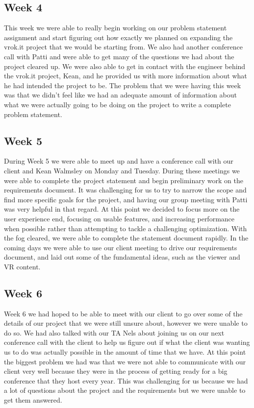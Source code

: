 \documentclass[10pt,draftclsnofoot,onecolumn]{IEEEtran}
\begin{document}
\subsection{Week 4}
This week we were able to really begin working on our problem statement assignment and start figuring out how exactly we planned on expanding the vrok.it project that we would be starting from. We also had another conference call with Patti and were able to get many of the questions we had about the project cleared up. We were also able to get in contact with the engineer behind the vrok.it project, Kean, and he provided us with more information about what he had intended the project to be. The problem that we were having this week was that we didn't feel like we had an adequate amount of information about what we were actually going to be doing on the project to write a complete problem statement. 

\subsection{Week 5}
During Week 5 we were able to meet up and have a conference call with our client and Kean Walmsley on Monday and Tuesday. During these meetings we were able to complete the project statement and begin preliminary work on the requirements document. It was challenging for us to try to narrow the scope and find more specific goals for the project, and having our group meeting with Patti was very helpful in that regard. At this point we decided to focus more on the user experience end, focusing on usable features, and increasing performance when possible rather than attempting to tackle a challenging optimization. With the fog cleared, we were able to complete the statement document rapidly. In the coming days we were able to use our client meeting to drive our requirements document, and laid out some of the fundamental ideas, such as the viewer and VR content.

\subsection{Week 6}
Week 6 we had hoped to be able to meet with our client to go over some of the details of our project that we were still unsure about, however we were unable to do so. We had also talked with our TA Nels about joining us on our next conference call with the client to help us figure out if what the client was wanting us to do was actually possible in the amount of time that we have. At this point the biggest problem we had was that we were not able to communicate with our client very well because they were in the process of getting ready for a big conference that they host every year. This was challenging for us because we had a lot of questions about the project and the requirements but we were unable to get them answered.
\end{document}

